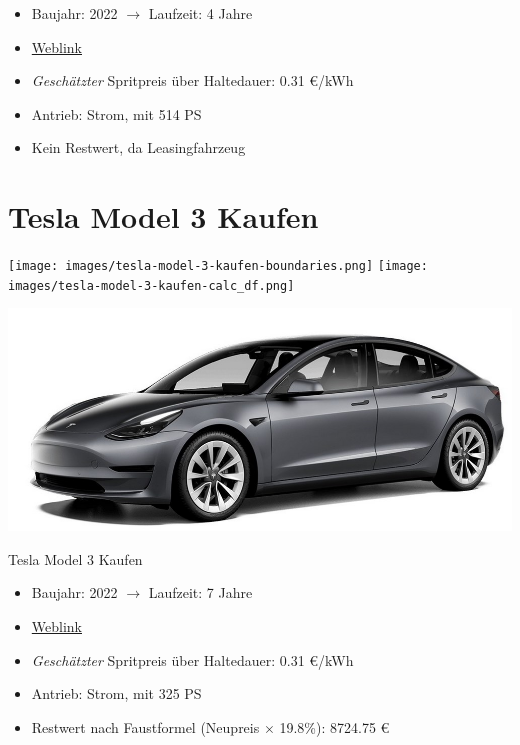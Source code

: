 \documentclass[landscape, DIV=99, 14pt]{scrartcl}
\begin{document}
\begin{itemize}
    \item Baujahr: 2022 $\rightarrow$ Laufzeit: 4 Jahre
    \item \href{https://www.tesla.com/de_de/modely/design\#overview}{Weblink}
    \item \emph{Gesch\"atzter} Spritpreis \"uber Haltedauer: 0.31 \euro{}/kWh
    \item Antrieb: Strom, mit 514 PS
    \item Kein Restwert, da Leasingfahrzeug
\end{itemize}

\pagebreak


\twocolumn

\section*{Tesla Model 3 Kaufen}
\begin{center}
\texttt{[image: images/tesla-model-3-kaufen-boundaries.png]}
\null
\vspace{0.5cm}
\texttt{[image: images/tesla-model-3-kaufen-calc\_df.png]}
\end{center}

\pagebreak
\null
\vspace{2cm}
\begin{center}
\includegraphics[width=0.9\columnwidth]{cars/tesla-model-3.jpg}

Tesla Model 3 Kaufen
\end{center}

\begin{itemize}
    \item Baujahr: 2022 $\rightarrow$ Laufzeit: 7 Jahre
    \item \href{https://www.tesla.com/de_de/model3/design\#overview}{Weblink}
    \item \emph{Gesch\"atzter} Spritpreis \"uber Haltedauer: 0.31 \euro{}/kWh
    \item Antrieb: Strom, mit 325 PS
    \item Restwert nach Faustformel (Neupreis $\times$ 19.8\%): 8724.75 \euro{}
\end{itemize}
\end{document}
